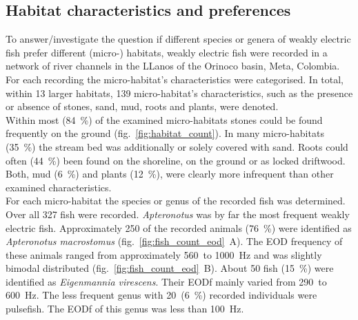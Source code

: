 
\subsection{Habitat characteristics and preferences}

To answer/investigate the question if different species or genera of weakly electric fish prefer different (micro-) habitats, weakly electric fish were recorded in a network of river channels in the LLanos of the Orinoco basin, Meta, Colombia. For each recording the micro-habitat's characteristics were categorised. In total, within 13 larger habitats, 139 micro-habitat's characteristics, such as the presence or absence of stones, sand, mud, roots and plants, were denoted.\\
Within most (84~\%) of the examined micro-habitats  stones could be found frequently on the ground (fig.~\ref{fig:habitat_count}). In many micro-habitats  (35~\%) the stream bed was additionally or solely covered with sand. Roots could often (44~\%) been found on the shoreline, on the ground or as locked driftwood. Both, mud (6~\%) and plants (12~\%), were clearly more infrequent than other examined characteristics.\\
For each micro-habitat the species or genus of the recorded fish was determined. Over all 327 fish were recorded. \textit{Apteronotus} was by far the most frequent weakly electric fish. Approximately 250 of the recorded animals (76~\%) were identified as \textit{Apteronotus macrostomus}  (fig.~\ref{fig:fish_count_eod}~A). The EOD frequency of these animals ranged from approximately 560~to 1000~Hz and was slightly bimodal distributed (fig.~\ref{fig:fish_count_eod}~B). About 50 fish (15~\%) were identified as \textit{Eigenmannia virescens}. Their EODf mainly varied from 290~to 600~Hz. The less frequent genus with 20~(6~\%) recorded individuals were pulsefish. The EODf of this genus was less than 100~Hz.

